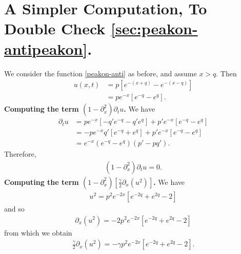 \documentclass[12pt,reqno]{amsart}
\numberwithin{equation}{section}  %
\numberwithin{figure}{section}
\newcommand{\p}{\partial}
\theoremstyle{plain}  %
\theoremstyle{definition}
\begin{document}
\section{A Simpler Computation, To Double Check
\autoref{sec:peakon-antipeakon}.}	
We consider the function \eqref{peakon-anti} as before, and assume $x >q$. Then
%
%
\begin{equation*}
  \begin{split}
    u(x,t) & = p\left[ e^{-(x+q)} - e^{-(x-q)} \right]
    \\
    & = p e^{-x}\left[ e^{-q} - e^{q} \right].
  \end{split}
\end{equation*}
%
%
{\bf Computing the term $ \displaystyle (1-\p_x^2) \p_t u$.}
We have
%
%
\begin{equation*}
  \begin{split}
    \p_t u
    & = pe^{-x}\left[ -q'e^{-q} - q' e^{q} \right] + p'e^{-x}\left[
    e^{-q}-e^{q}
    \right]
    \\
    & = -pe^{-x}q'\left[ e^{-q} + e^{q} \right] + p'e^{-x}\left[ e^{-q} -
    e^{q}
    \right]
    \\
    & = e^{-x}\left( e^{-q}-e^{q} \right)\left( p' - pq' \right).
  \end{split}
\end{equation*}
%
%
Therefore,
%
%
\begin{equation}
  \label{pseudo-dtu}
  \begin{split}
    \left( 1- \p_x^2 \right) \p_t u = 0.
  \end{split}
\end{equation}
%
%
{\bf Computing the term $ \displaystyle \left( 1- \p_x^2 \right)\left[
\frac{\gamma}{2} \p_x(u^2) \right] $.}
We have
%
%
\begin{equation*}
  \begin{split}
    u^{2} = p^{2}e^{-2x}\left[ e^{-2q} + e^{2q}-2 \right]
  \end{split}
\end{equation*}
%
%
and so
%
%
\begin{equation*}
  \begin{split}
    \p_x(u^{2}) = -2p^{2}e^{-2x}\left[ e^{-2q} + e^{2q} -2 \right]
  \end{split}
\end{equation*}
%
%
from which we obtain
%
%
\begin{equation*}
  \begin{split}
    \frac{\gamma}{2} \p_{x}(u^{2}) = - \gamma p^{2}e^{-2x}\left[ e^{-2q} +
    e^{2q} -2
    \right].
  \end{split}
\end{equation*}
\end{document}

